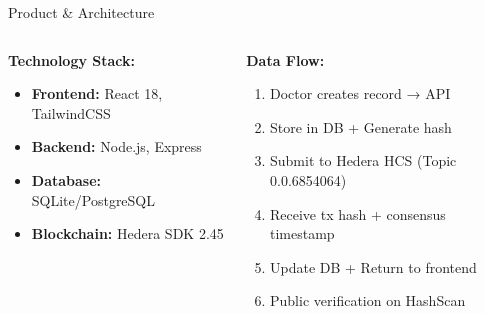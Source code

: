 \documentclass[aspectratio=169,xcolor=dvipsnames,14pt]{beamer}
\begin{document}
\begin{frame}[fragile]{Product \& Architecture}
\begin{center}
  \end{center}

  \vspace{0.3cm}

  \begin{columns}[T]
    \begin{column}{0.5\textwidth}
      \textbf{Technology Stack:}
      \begin{itemize}
        \item \textbf{Frontend:} React 18, TailwindCSS
        \item \textbf{Backend:} Node.js, Express
        \item \textbf{Database:} SQLite/PostgreSQL
        \item \textbf{Blockchain:} Hedera SDK 2.45
      \end{itemize}
    \end{column}

    \begin{column}{0.5\textwidth}
      \textbf{Data Flow:}
      \begin{enumerate}
        \item Doctor creates record → API
        \item Store in DB + Generate hash
        \item Submit to Hedera HCS (Topic 0.0.6854064)
        \item Receive tx hash + consensus timestamp
        \item Update DB + Return to frontend
        \item \textcolor{SuccessGreen}{Public verification on HashScan}
      \end{enumerate}
    \end{column}
  \end{columns}

\end{frame}
\end{document}
